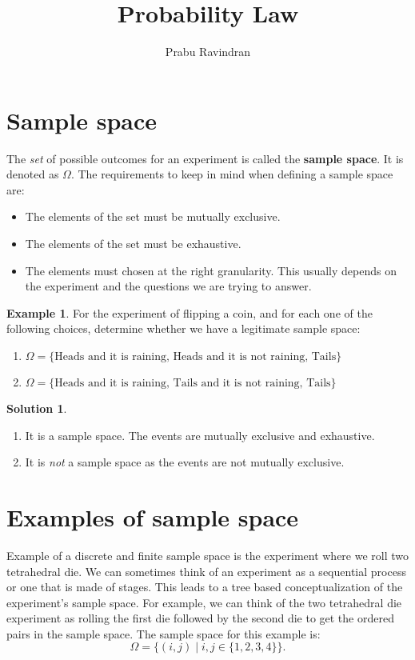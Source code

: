 \documentclass[11pt]{amsart}
\title[]{Probability Law}
\author[]{Prabu Ravindran}
\theoremstyle{definition} \newtheorem{thm}{Theorem} \theoremstyle{plain}
\theoremstyle{definition} \newtheorem*{nnthm}{Theorem} \theoremstyle{plain}
\theoremstyle{definition} \newtheorem{lem}{Lemma} \theoremstyle{plain}
\theoremstyle{definition} \newtheorem*{nnlem}{Lemma} \theoremstyle{plain}
\theoremstyle{definition} \newtheorem{prf}{Proof} \theoremstyle{plain}
\theoremstyle{definition} \newtheorem*{nnprf}{Proof} \theoremstyle{plain}
\theoremstyle{definition} \newtheorem{eg}{Example} \theoremstyle{plain}
\theoremstyle{definition} \newtheorem*{sol}{Solution} \theoremstyle{plain}
\begin{document}
\maketitle
\thispagestyle{empty}

\section{Sample space}
The \emph{set} of possible outcomes for an experiment is called the 
\textbf{sample space}. It is denoted as $\Omega$. The requirements to keep in 
mind when defining a sample space are:
\begin{itemize}
\item The elements of the set must be mutually exclusive. 
\item The elements of the set must be exhaustive.
\item The elements must chosen at the right granularity. This usually 
    depends on the experiment and the questions we are trying to answer. 
\end{itemize}

\begin{eg} 
For the experiment of flipping a coin, and for 
each one of the following choices, determine whether we have a legitimate 
sample space:
\begin{enumerate}
\item
$\Omega = \{\mbox{Heads and it is raining, 
                   Heads and it is not raining, 
                   Tails}\}$
\item
$\Omega = \{\mbox{Heads and it is raining, 
                  Tails and it is not raining, 
                  Tails}\}$ 
\end{enumerate}
\end{eg}
\begin{sol}
\hfill
\begin{enumerate}
\item
It is a sample space. The events are mutually exclusive and exhaustive.
\item
It is \emph{not} a sample space as the events are not mutually exclusive. 
\end{enumerate}
\end{sol} 

\section{Examples of sample space}
Example of a discrete and finite sample space is the experiment where we roll 
two tetrahedral die. We can sometimes think of an experiment as a sequential 
process or one that is made of stages. This leads to a tree based 
conceptualization of the experiment's sample space. For example, we can think 
of the two tetrahedral die experiment as rolling the first die followed by the 
second die to get the ordered pairs in the sample space. The sample space for 
this example is:
\begin{equation*}
\Omega = \{ (i, j) \mid i, j \in \{ 1, 2, 3, 4 \} \}.
\end{equation*}
\end{document}
